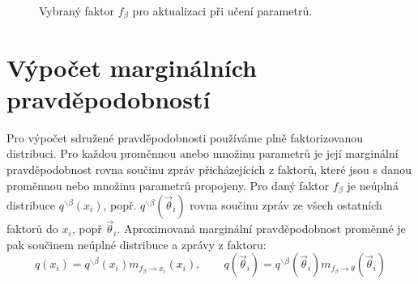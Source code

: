 \begin{figure}[h]
\begin{center}
\end{center}
\caption{Vybraný faktor $f_\beta$ pro aktualizaci při učení parametrů.}
\label{ex:factor}
\end{figure}

\section{Výpočet marginálních pravděpodobností}

Pro výpočet sdružené pravděpodobnosti používáme plně faktorizovanou distribuci.
Pro každou proměnnou anebo množinu parametrů je její marginální pravděpodobnost
rovna součinu zpráv přicházejících z faktorů, které jsou s danou proměnnou
nebo množinu parametrů propojeny.
Pro daný faktor $f_\beta$ je neúplná distribuce $q^{\backslash \beta}(x_i)$, popř.
$q^{\backslash \beta}(\vec{\theta}_i)$ rovna součinu zpráv ze všech ostatních faktorů do $x_i$, popř $\vec\theta_i$.
Aproximovaná marginální pravděpodobnost proměnné je pak součinem neúplné
distribuce a zprávy z faktoru:
$$q(x_i) = q^{\backslash \beta}(x_i) m_{f_\beta \rightarrow x_i}(x_i), 
\quad \quad
q(\vec{\theta}_i) = q^{\backslash \beta}(\vec{\theta}_i) m_{f_\beta \rightarrow \theta}(\vec{\theta}_i)$$

